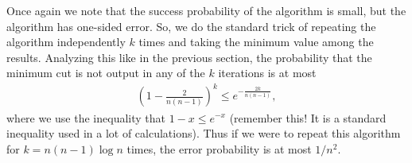Once again we note that the success probability of the algorithm is small, but the algorithm has one-sided error. So, we do the standard trick of repeating the algorithm independently $k$ times and taking the minimum value among the results. Analyzing this like in the previous section, the probability that the minimum cut is not output in any of the $k$ iterations is at most
\begin{align*}
	\left(1 - \frac{2}{n(n-1)} \right)^k \leq e^{-\frac{2k}{n(n-1)}},
\end{align*}
where we use the inequality that $1-x \leq e^{-x}$ (remember this! It is a standard inequality used in a lot of calculations). Thus if we were to repeat this algorithm for $k=n(n-1)\log n$ times, the error probability is at most $1/n^2$.

